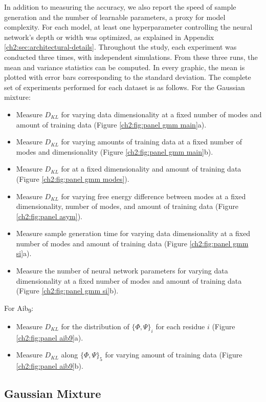 In addition to measuring the accuracy, we also report the speed of sample generation and the number of learnable parameters, a proxy for model complexity. For each model, at least one hyperparameter controlling the neural network's depth or width was optimized, as explained in Appendix \ref{ch2:sec:architectural-details}. Throughout the study, each experiment was conducted three times, with independent simulations. From these three runs, the mean and variance statistics can be computed. In every graphic, the mean is plotted with error bars corresponding to the standard deviation. The complete set of experiments performed for each dataset is as follows. For the Gaussian mixture:
\begin{itemize}
    \item Measure $D_{KL}$ for varying data dimensionality at a fixed number of modes and amount of training data (Figure \ref{ch2:fig:panel gmm main}a).
    \item Measure $D_{KL}$ for varying amounts of training data at a fixed number of modes and dimensionality (Figure \ref{ch2:fig:panel gmm main}b).
    \item Measure $D_{KL}$ for  at a fixed dimensionality and amount of training data (Figure \ref{ch2:fig:panel gmm modes}).
    \item Measure $D_{KL}$ for varying free energy difference between modes at a fixed dimensionality, number of modes, and amount of training data (Figure \ref{ch2:fig:panel asym}).
    \item Measure sample generation time for varying data dimensionality at a fixed number of modes and amount of training data (Figure \ref{ch2:fig:panel gmm si}a).
    \item Measure the number of neural network parameters for varying data dimensionality at a fixed number of modes and amount of training data (Figure \ref{ch2:fig:panel gmm si}b).
\end{itemize}
For Aib\textsubscript{9}:
\begin{itemize}
    \item Measure $D_{KL}$ for the distribution of $\{\Phi, \Psi \}_i$ for each residue $i$ (Figure \ref{ch2:fig:panel aib9}a).
    \item Measure $D_{KL}$ along $\{\Phi, \Psi \}_5$ for varying amount of training data (Figure \ref{ch2:fig:panel aib9}b).
\end{itemize}

\subsection{Gaussian Mixture}
\label{ch2:sec:gmm}

